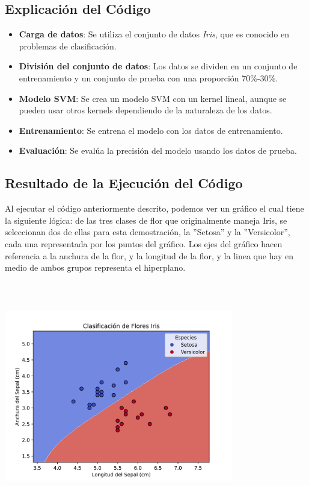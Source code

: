 \documentclass[a4paper,12pt]{article}
\begin{document}
\subsection{Explicación del Código}
\begin{itemize}
    \item \textbf{Carga de datos}: Se utiliza el conjunto de datos \textit{Iris}, que es conocido en problemas de clasificación.
    \item \textbf{División del conjunto de datos}: Los datos se dividen en un conjunto de entrenamiento y un conjunto de prueba con una proporción 70\%-30\%.
    \item \textbf{Modelo SVM}: Se crea un modelo SVM con un kernel lineal, aunque se pueden usar otros kernels dependiendo de la naturaleza de los datos.
    \item \textbf{Entrenamiento}: Se entrena el modelo con los datos de entrenamiento.
    \item \textbf{Evaluación}: Se evalúa la precisión del modelo usando los datos de prueba.
\end{itemize}

\pagebreak

\subsection{Resultado de la Ejecución del Código}

Al ejecutar el código anteriormente descrito, podemos ver un gráfico el cual tiene la siguiente lógica: de las tres clases de flor que originalmente maneja Iris, se seleccionan dos de ellas para esta demostración, la ''Setosa'' y la ''Versicolor'', cada una representada por los puntos del gráfico. Los ejes del gráfico hacen referencia a la anchura de la flor, y la longitud de la flor, y la linea que hay en medio de ambos grupos representa el hiperplano.

\begin{center}
  \includegraphics[width=10cm, height=10cm]{plots/svm_decision_boundary_20241011_222144.png}
\end{center}
\end{document}
